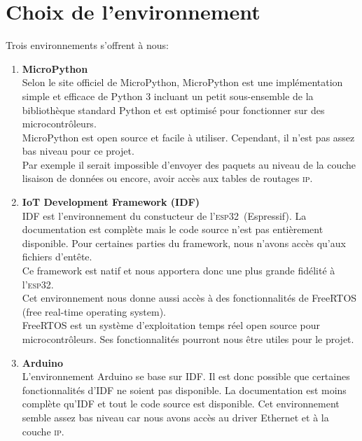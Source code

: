 \documentclass[a4paper, 12pt]{report}
\newcommand{\esp}{\textsc{esp32}}
\begin{document}
\section{Choix de l'environnement}
    Trois environnements s'offrent à nous:
    \begin{enumerate}
        \item \textbf{MicroPython}\\
            Selon le site officiel de MicroPython\cite{micropython_w}, MicroPython est une implémentation simple et efficace de Python 3
            incluant un petit sous-ensemble de la bibliothèque standard Python et est optimisé pour fonctionner sur des microcontrôleurs.\\
            MicroPython est open source et facile à utiliser. Cependant, il n'est pas assez bas niveau pour ce projet.\\
            Par exemple il serait impossible d'envoyer des paquets au niveau de la couche lisaison de données ou encore, avoir accès aux tables de routages \textsc{ip}.\\
        
        \item \textbf{IoT Development Framework (IDF)}\\
            IDF est l'environnement du constucteur de l'\esp\ (Espressif). La documentation est complète mais le code source n'est pas entièrement disponible. Pour certaines
            parties du framework, nous n'avons accès qu'aux fichiers d'entête.\\
            Ce framework est natif et nous apportera donc une plus grande fidélité à l'\esp. \\
            Cet environnement nous donne aussi accès à des fonctionnalités de FreeRTOS (free real-time operating system).\\
            FreeRTOS est un système d'exploitation temps réel open source pour microcontrôleurs. Ses fonctionnalités pourront nous être utiles pour le projet.\\

        \item \textbf{Arduino}\\
            L'environnement Arduino se base sur IDF. Il est donc possible que certaines fonctionnalités d'IDF ne soient pas disponible. La documentation est moins complète qu'IDF et tout le code source est disponible. Cet environnement semble assez bas
            niveau car nous avons accès au driver Ethernet et à la couche \textsc{ip}.
    \end{enumerate}
\end{document}
